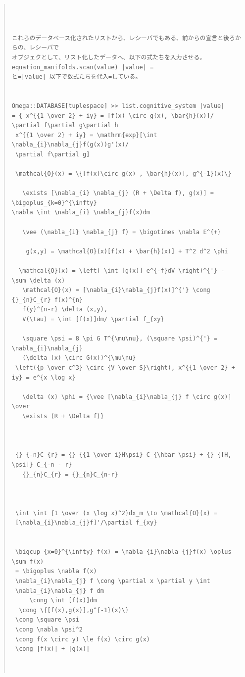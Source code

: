 \documentclass{jsarticle}
\begin{document}
\begin{quote}
\setlength{\baselineskip}{12pt}
\begin{verbatim}



これらのデータベース化されたリストから、レシーバでもある、前からの宣言と後ろからの、レシーバで
オブジェクとして、リスト化したデータへ、以下の式たちを入力させる。equation_manifolds.scan(value) |value| = 
と=|value| 以下で数式たちを代入=している。


Omega::DATABASE[tuplespace] >> list.cognitive_system |value| 
= { x^{{1 \over 2} + iy} = [f(x) \circ g(x), \bar{h}(x)]/ \partial f\partial g\partial h 
 x^{{1 \over 2} + iy} = \mathrm{exp}[\int \nabla_{i}\nabla_{j}f(g(x))g'(x)/
 \partial f\partial g] 

 \mathcal{O}(x) = \{[f(x)\circ g(x) , \bar{h}(x)], g^{-1}(x)\} 

   \exists [\nabla_{i} \nabla_{j} (R + \Delta f), g(x)] = \bigoplus_{k=0}^{\infty}
\nabla \int \nabla_{i} \nabla_{j}f(x)dm 

   \vee (\nabla_{i} \nabla_{j} f) = \bigotimes \nabla E^{+} 

    g(x,y) = \mathcal{O}(x)[f(x) + \bar{h}(x)] + T^2 d^2 \phi 

  \mathcal{O}(x) = \left( \int [g(x)] e^{-f}dV \right)^{'} - \sum \delta (x) 
   \mathcal{O}(x) = [\nabla_{i}\nabla_{j}f(x)]^{'} \cong {}_{n}C_{r} f(x)^{n} 
   f(y)^{n-r} \delta (x,y), 
   V(\tau) = \int [f(x)]dm/ \partial f_{xy} 

   \square \psi = 8 \pi G T^{\mu\nu}, (\square \psi)^{'} = \nabla_{i}\nabla_{j}
   (\delta (x) \circ G(x))^{\mu\nu}
 \left({p \over c^3} \circ {V \over S}\right), x^{{1 \over 2} + iy} = e^{x \log x} 

   \delta (x) \phi = {\vee [\nabla_{i}\nabla_{j} f \circ g(x)] \over 
   \exists (R + \Delta f)} 



 {}_{-n}C_{r} = {}_{{1 \over i}H\psi} C_{\hbar \psi} + {}_{[H, \psi]} C_{-n - r} 
   {}_{n}C_{r} = {}_{n}C_{n-r} 



 \int \int {1 \over (x \log x)^2}dx_m \to \mathcal{O}(x) = 
 [\nabla_{i}\nabla_{j}f]'/\partial f_{xy}


 \bigcup_{x=0}^{\infty} f(x) = \nabla_{i}\nabla_{j}f(x) \oplus \sum f(x) 
 = \bigoplus \nabla f(x) 
 \nabla_{i}\nabla_{j} f \cong \partial x \partial y \int 
 \nabla_{i}\nabla_{j} f dm 
     \cong \int [f(x)]dm 
  \cong \{[f(x),g(x)],g^{-1}(x)\} 
 \cong \square \psi  
 \cong \nabla \psi^2 
 \cong f(x \circ y) \le f(x) \circ g(x)
 \cong |f(x)| + |g(x)| 



\end{verbatim}
\end{quote}
\end{document}
